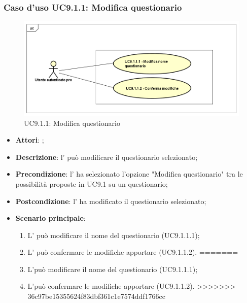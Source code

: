 			\subsubsection{Caso d'uso UC9.1.1: Modifica questionario}
			\label{UC9.1.1}
			\begin{figure}[h]
				\centering
			\includegraphics[scale=0.5,keepaspectratio]{UML/UC9_1_1.png}
				\caption{UC9.1.1: Modifica questionario}
			\end{figure}
			\FloatBarrier
			\begin{itemize}
				\item \textbf{Attori}: \uaupro{};
				\item \textbf{Descrizione}: l'\uaupro{} può modificare il questionario selezionato;
				\item \textbf{Precondizione}: l'\uaupro{} ha selezionato l'opzione "Modifica questionario" tra le possibilità proposte in UC9.1 su un questionario;
				\item \textbf{Postcondizione}: l'\uaupro{} ha modificato il questionario selezionato; 
				\item \textbf{Scenario principale}:
					\begin{enumerate}
<<<<<<< HEAD
						\item L'\uaupro{} può modificare il nome del questionario (UC9.1.1.1);
						\item L'\uaupro{} può confermare le modifiche apportare (UC9.1.1.2).
=======
						\item L'\uaupro può modificare il nome del questionario (UC9.1.1.1);
						\item L'\uaupro può confermare le modifiche apportare (UC9.1.1.2).
>>>>>>> 36c97be15355624f83dbf361c1e7574ddf1766cc
					\end{enumerate}
			\end{itemize}
								
